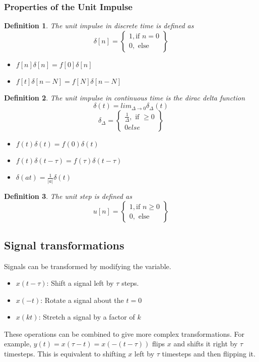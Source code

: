 \documentclass{article}
\newtheorem{definition}{Definition}
\begin{document}
\subsubsection{Properties of the Unit Impulse}
\begin{definition}
    The unit impulse in discrete time is defined as 
    \[
        \delta[n] = \left\{
            \begin{array}{cc}
                1, \text{if } n=0\\
                0, \text{ else}
            \end{array}
            \right\}
    \]
\end{definition}
\begin{itemize}
    \item $f[n]\delta[n] = f[0]\delta[n]$
    \item $f[t]\delta[n-N] = f[N]\delta[n-N]$
\end{itemize}
\begin{definition}
    The unit impulse in continuous time is the dirac delta function
    $$\delta(t)=lim_{\Delta\rightarrow 0}\delta_{\Delta}(t)$$
    \[
        \delta_{\Delta}=\left\{
            \begin{array}{c}
                \frac{1}{\Delta},\text{ if }\ge 0 \\
                0 else
            \end{array}
        \right\}
    \]
\end{definition}
\begin{itemize}
    \item $f(t)\delta(t) = f(0)\delta(t)$
    \item $f(t)\delta(t-\tau) = f(\tau)\delta(t-\tau)$
    \item $\delta(at) = \frac{1}{|a|}\delta(t)$
\end{itemize}
\begin{definition}
    The unit step is defined as 
    \[
        u[n] = \left\{
            \begin{array}{cc}
                1, \text{if } n \geq 0\\
                0, \text{ else}
            \end{array}
            \right\}
    \]
\end{definition}
\subsection{Signal transformations}
Signals can be transformed by modifying the variable.
\begin{itemize}
    \item $x(t - \tau)$: Shift a signal left by $\tau$ steps.
    \item $x(-t)$: Rotate a signal about the $t=0$
    \item $x(kt)$: Stretch a signal by a factor of $k$
\end{itemize}
These operations can be combined to give more complex transformations.
For example, $y(t) = x(\tau - t) = x(-(t-\tau))$ flips $x$ and shifts it right by $\tau$ timesteps.
This is equivalent to shifting $x$ left by $\tau$ timesteps and then flipping it.
\end{document}
